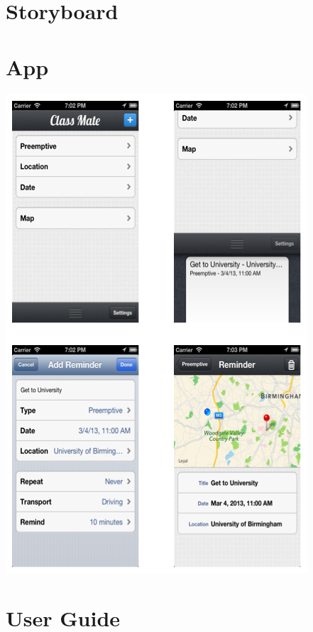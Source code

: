 \documentclass[12pt]{report}
\begin{document}
\section{Storyboard}\label{appendix:storyboard}

\section{App}\label{appendix:app}
\includegraphics{images/class-mate}

\section{User Guide}
\end{document}
